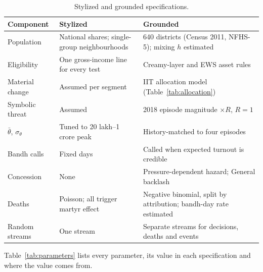 \documentclass[11pt,a4paper]{article}
\begin{document}
\begin{table}[H]
\centering\small
\caption{Stylized and grounded specifications.}
\label{tab:specifications}
\begin{tabularx}{\linewidth}{@{}lLL@{}}
\toprule
Component & Stylized & Grounded\\
\midrule
Population & National shares; single-group neighbourhoods & 640 districts (Census 2011, NFHS-5); mixing $h$ estimated\\
Eligibility & One gross-income line for every test & Creamy-layer and EWS asset rules\\
Material change & Assumed per segment & IIT allocation model (Table~\ref{tab:allocation})\\
Symbolic threat & Assumed & 2018 episode magnitude $\times R$, $R=1$\\
$\bar\theta$, $\sigma_\theta$ & Tuned to 20 lakh--1 crore peak & History-matched to four episodes\\
Bandh calls & Fixed days & Called when expected turnout is credible\\
Concession & None & Pressure-dependent hazard; General backlash\\
Deaths & Poisson; all trigger martyr effect & Negative binomial, split by attribution; bandh-day rate estimated\\
Random streams & One stream & Separate streams for decisions, deaths and events\\
\bottomrule
\end{tabularx}
\end{table}

Table~\ref{tab:parameters} lists every parameter, its value in each specification and where the value comes from.
\end{document}
